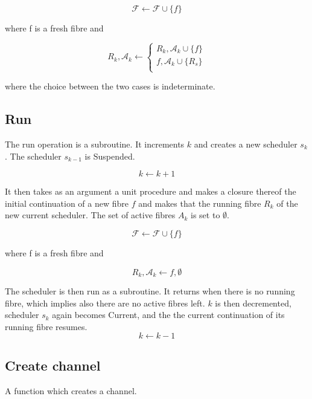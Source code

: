 \documentclass[oneside]{book}
\begin{document}
\begin{equation}
{\mathcal F} \leftarrow {\mathcal F} \cup \{f\}
\end{equation}

where f is a fresh fibre and

\begin{equation}
R_k,{\mathcal A_k} \leftarrow
\begin{cases}
R_k,{\mathcal A_k} \cup \{f\} \\
f,{\mathcal A_k} \cup \{R_s\} \\
\end{cases}
\end{equation}

where the choice between the two cases is indeterminate.

\subsection{Run} 
The run operation is a subroutine. It increments $k$ and creates
a new scheduler $s_k$. The scheduler $s_{k-1}$ is Suspended. 

\begin{equation}
k \leftarrow k + 1
\end{equation}


It then takes as an argument a unit procedure and makes
a closure thereof the initial continuation
of a new fibre $f$ and makes that the running fibre $R_k$ of
the new current scheduler. The set of active fibres $A_k$
is set to $\emptyset$. 

 
\begin{equation}
{\mathcal F} \leftarrow {\mathcal F} \cup \{f\}
\end{equation}

where f is a fresh fibre and

\begin{equation}
R_k,\mathcal A_k \leftarrow
f,\emptyset
\end{equation}

The scheduler is then run as a subroutine. It returns when there
is no running fibre, which implies also there are no active
fibres left. $k$ is then decremented, scheduler $s_k$ again becomes Current, 
and the the
current continuation of its running fibre resumes.
\begin{equation}
k \leftarrow k - 1
\end{equation}

\subsection{Create channel}
A function which creates a channel.
\end{document}
